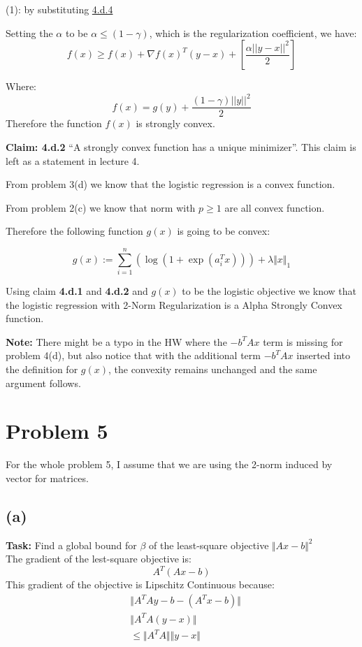 \documentclass[]{article}
\begin{document}
    \par
    (1): by substituting \hyperref[eqn:4.d.4]{4.d.4}
    \par
    Setting the $\alpha$ to be $ \alpha \le (1 - \gamma)$, which is the regularization coefficient, we have: 
    $$
    f(x) \ge f(x) + \nabla f(x)^T(y - x) + \left\lbrack\frac{\alpha||y - x||^2}{2}\right\rbrack
    $$
    \par
    Where: 
    $$
    f(x) = g(y)+\frac{(1 - \gamma)||y||^2}{2}
    $$
    Therefore the function $f(x)$ is strongly convex. 
    \par
    \textbf{Claim: 4.d.2} ``A strongly convex function has a unique minimizer''. This claim is left as a statement in lecture 4. 
    \par
    From problem 3(d) we know that the logistic regression is a convex function. 
    \par
    From problem 2(c) we know that norm with $p \ge 1$ are all convex function.
    \par
    Therefore the following function $g(x)$ is going to be convex: 
    \par
    $$
    g(x):= \sum_{i = 1}^{n} \left(
        \log(1 + \exp(a_i^Tx))
      \right)
      + \lambda \Vert x\Vert_1
    $$
    \par
    Using claim \textbf{4.d.1} and \textbf{4.d.2} and $g(x)$ to be the logistic objective we know that the logistic regression with 2-Norm Regularization is a Alpha Strongly Convex function.

    \par
    \textbf{Note: }There might be a typo in the HW where the $-b^TAx$ term is missing for problem 4(d), but also notice that with the additional term $-b^TAx$ inserted into the definition for $g(x)$, the convexity remains unchanged and the same argument follows. 

\newpage
\section*{Problem 5}
For the whole problem 5, I assume that we are using the 2-norm induced by vector for matrices. 
\subsection*{(a)}
    \textbf{Task: } Find a global bound for $\beta$ of the least-square objective $\Vert Ax - b\Vert^2$
    \\
    The gradient of the lest-square objective is: 
        \begin{equation*}\tag{5.a.1}\label{eqn:5.a.1}
            A^T(Ax - b)
        \end{equation*}
    This gradient of the objective is Lipschitz Continuous because: 
        \begin{align*}\tag{5.a.2}\label{eqn:5.a.2}
            &\Vert A^TAy- b - \left(
                A^Tx - b
            \right)\Vert
            \\
            &\Vert A^TA(y - x)\Vert
            \\
            &\le \Vert A^TA\Vert \Vert y - x\Vert
        \end{align*}
\end{document}
